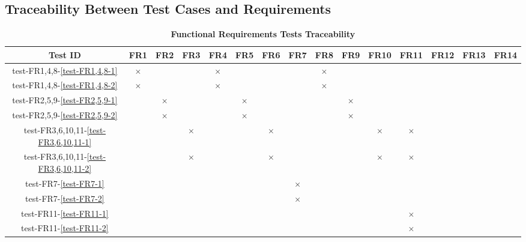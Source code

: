 \documentclass[12pt, titlepage]{article}
\begin{document}
\newpage


\begin{landscape}
\subsection{Traceability Between Test Cases and Requirements} \label{section:4.4}

\begin{table}[H]
  \centering
  \begin{tabular}{|c|c|c|c|c|c|c|c|c|c|c|c|c|c|c|}
  \hline
   Test ID & FR1 & FR2 & FR3 & FR4 & FR5 & FR6 & FR7 & FR8 & FR9 & FR10 & FR11 & FR12 & FR13 & FR14\\
  \hline
  test-FR1,4,8-\ref{test-FR1,4,8-1} & $\times$ & & & $\times$ & & & & $\times$ & & & & & & \\
  \hline
  test-FR1,4,8-\ref{test-FR1,4,8-2} & $\times$ & & & $\times$ & & & & $\times$ & & & & & & \\
  \hline
  test-FR2,5,9-\ref{test-FR2,5,9-1} & & $\times$ & & & $\times$ & & & & $\times$ & & & & & \\
  \hline
  test-FR2,5,9-\ref{test-FR2,5,9-2} & & $\times$ & & & $\times$ & & & & $\times$ & & & & & \\
  \hline
  test-FR3,6,10,11-\ref{test-FR3,6,10,11-1} & & & $\times$ & & & $\times$ & & & & $\times$ & $\times$ & & & \\
  \hline
  test-FR3,6,10,11-\ref{test-FR3,6,10,11-2} & & & $\times$ & & & $\times$ & & & & $\times$ & $\times$ & & & \\
  \hline
  test-FR7-\ref{test-FR7-1} & & & & & & & $\times$ & & & & & & & \\
  \hline
  test-FR7-\ref{test-FR7-2} & & & & & & & $\times$ & & & & & & & \\
  \hline
  test-FR11-\ref{test-FR11-1} & & & & & & & & & & & $\times$ & & & \\
  \hline
  test-FR11-\ref{test-FR11-2} & & & & & & & & & & & $\times$ & & & \\
  \hline
\end{tabular}
\caption{\bf Functional Requirements Tests Traceability} \label{tab:fr-test-traceability}
\end{table}



\end{landscape}
\end{document}

